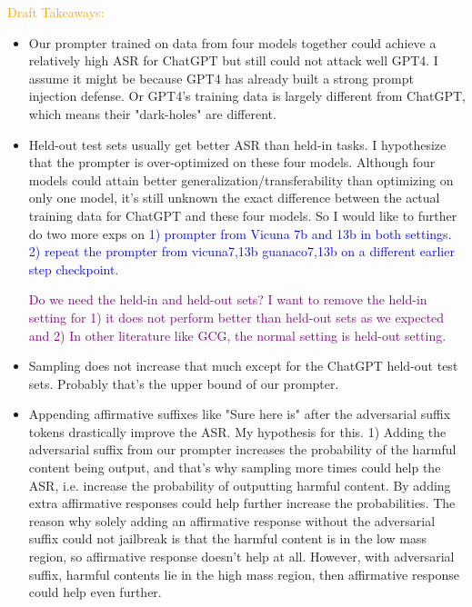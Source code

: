 \documentclass{article}
\begin{document}
\textcolor{orange}{Draft Takeaways:}
\begin{itemize}

\item Our prompter trained on data from four models together could achieve a relatively high ASR for ChatGPT but still could not attack well GPT4. I assume it might be because GPT4 has already built a strong prompt injection defense. Or GPT4's training data is largely different from ChatGPT, which means their "dark-holes" are different.

\item Held-out test sets usually get better ASR than held-in tasks. I hypothesize that the prompter is over-optimized on these four models. Although four models could attain better generalization/transferability than optimizing on only one model, it's still unknown the exact difference between the actual training data for ChatGPT and these four models. So I would like to further do two more exps on \textcolor{blue}{1) prompter from Vicuna 7b and 13b in both settings. 2) repeat the prompter from vicuna7,13b guanaco7,13b on a different earlier step checkpoint.}

\textcolor{purple}{Do we need the held-in and held-out sets? I want to remove the held-in setting for 1) it does not perform better than held-out sets as we expected and 2) In other literature like GCG, the normal setting is held-out setting. }


\item Sampling does not increase that much except for the ChatGPT held-out test sets. Probably that's the upper bound of our prompter.

\item Appending affirmative suffixes like "Sure here is" after the adversarial suffix tokens drastically improve the ASR. My hypothesis for this. 1) Adding the adversarial suffix from our prompter increases the probability of the harmful content being output, and that's why sampling more times could help the ASR, i.e. increase the probability of outputting harmful content. By adding extra affirmative responses could help further increase the probabilities. The reason why solely adding an affirmative response without the adversarial suffix could not jailbreak is that the harmful content is in the low mass region, so affirmative response doesn't help at all. However, with adversarial suffix, harmful contents lie in the high mass region, then affirmative response could help even further.
\end{itemize}
\end{document}
